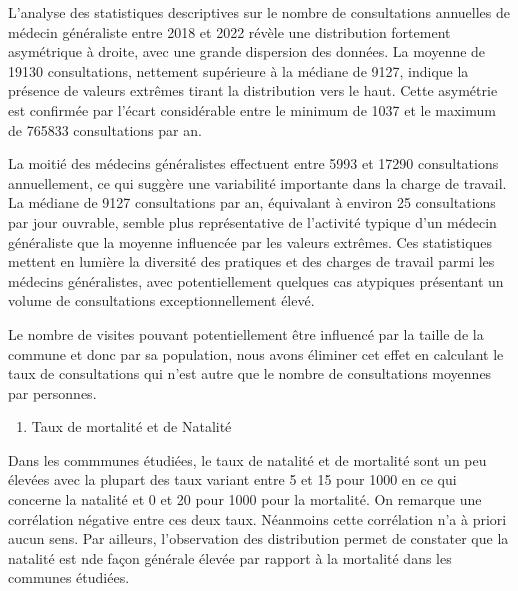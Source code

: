 L'analyse des statistiques descriptives sur le nombre de consultations
annuelles de médecin généraliste entre 2018 et 2022 révèle une
distribution fortement asymétrique à droite, avec une grande dispersion
des données. La moyenne de 19130 consultations, nettement supérieure à
la médiane de 9127, indique la présence de valeurs extrêmes tirant la
distribution vers le haut. Cette asymétrie est confirmée par l'écart
considérable entre le minimum de 1037 et le maximum de 765833
consultations par an.

La moitié des médecins généralistes effectuent entre 5993 et 17290
consultations annuellement, ce qui suggère une variabilité importante
dans la charge de travail. La médiane de 9127 consultations par an,
équivalant à environ 25 consultations par jour ouvrable, semble plus
représentative de l'activité typique d'un médecin généraliste que la
moyenne influencée par les valeurs extrêmes. Ces statistiques mettent en
lumière la diversité des pratiques et des charges de travail parmi les
médecins généralistes, avec potentiellement quelques cas atypiques
présentant un volume de consultations exceptionnellement élevé.

Le nombre de visites pouvant potentiellement être influencé par la
taille de la commune et donc par sa population, nous avons éliminer cet
effet en calculant le taux de consultations qui n'est autre que le
nombre de consultations moyennes par personnes.

\begin{enumerate}
\def\labelenumi{\arabic{enumi}.}
\setcounter{enumi}{1}
\tightlist
\item
  Taux de mortalité et de Natalité
\end{enumerate}

Dans les commmunes étudiées, le taux de natalité et de mortalité sont un
peu élevées avec la plupart des taux variant entre 5 et 15 pour 1000 en
ce qui concerne la natalité et 0 et 20 pour 1000 pour la mortalité. On
remarque une corrélation négative entre ces deux taux. Néanmoins cette
corrélation n'a à priori aucun sens. Par ailleurs, l'observation des
distribution permet de constater que la natalité est nde façon générale
élevée par rapport à la mortalité dans les communes étudiées.

